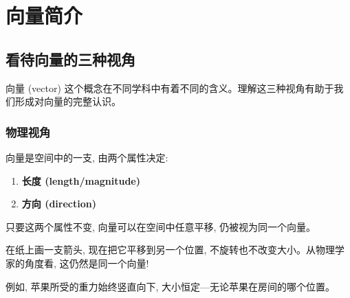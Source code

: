
\chapter{向量简介}
\label{ch:vectors}

\begin{abstract}
向量 (vector) 是线性代数的基本构件。在本章中, 我们将从三个不同的视角来认识向量: 物理视角、计算机科学视角和数学视角。我们还将学习向量加法 (vector addition) 与标量乘法 (scalar multiplication) 这两种基本运算。
\end{abstract}

\section{看待向量的三种视角}

向量 (vector) 这个概念在不同学科中有着不同的含义。理解这三种视角有助于我们形成对向量的完整认识。

\subsection{物理视角}

\begin{definition}[物理视角下的向量]
向量是空间中的一支, 由两个属性决定:
\begin{enumerate}
    \item \textbf{长度 (length/magnitude)}
    \item \textbf{方向 (direction)}
\end{enumerate}
只要这两个属性不变, 向量可以在空间中任意平移, 仍被视为同一个向量。
\end{definition}

\begin{intuition}
在纸上画一支箭头, 现在把它平移到另一个位置, 不旋转也不改变大小。从物理学家的角度看, 这仍然是同一个向量!

例如, 苹果所受的重力始终竖直向下, 大小恒定---无论苹果在房间的哪个位置。
\end{intuition}

\begin{center}
\end{center}

